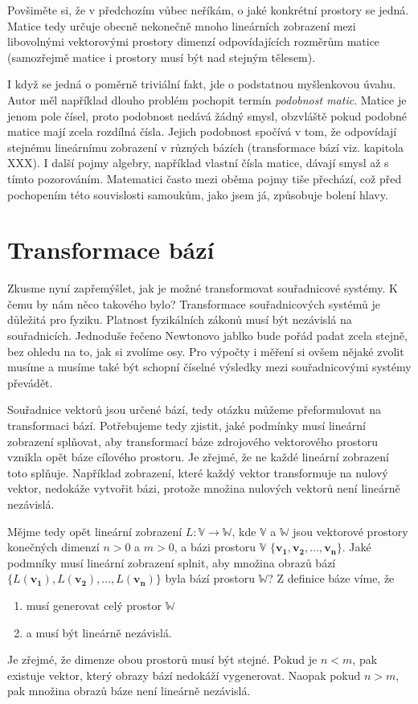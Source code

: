 \documentclass[a5paper,12pt]{amsbook}
\theoremstyle{definition}
\newcommand{\myvec}[1]{\bm{#1}}
\newcommand{\myspace}[1]{\mathbb{#1}}
\newcommand{\mymap}[1]{#1}
\begin{document}
Povšiměte si, že v předchozím vůbec neříkám, o jaké konkrétní prostory se jedná. Matice tedy
určuje obecně nekonečně mnoho lineárních zobrazení mezi libovolnými vektorovými prostory dimenzí
odpovídajících rozměrům matice (samozřejmě matice i prostory musí být nad stejným tělesem).

I když se jedná o poměrně triviální fakt, jde o podstatnou myšlenkovou úvahu.
Autor měl například dlouho problém pochopit termín \textit{podobnost matic}. Matice je jenom
pole čísel, proto podobnost nedává žádný smysl, obzvláště pokud podobné matice mají zcela
rozdílná čísla. Jejich podobnost spočívá v tom, že odpovídají stejnému lineárnímu zobrazení
v různých bázích (transformace bází viz. kapitola XXX). I další pojmy algebry, například vlastní
čísla matice, dávají smysl až s tímto pozorováním. Matematici často mezi oběma pojmy tiše přechází,
což před pochopením této souvislosti samoukům, jako jsem já, způsobuje bolení hlavy.

\section{Transformace bází}

\noindent Zkusme nyní zapřemýšlet, jak je možné transformovat souřadnicové systémy.  K čemu by nám
něco takového bylo? Transformace souřadnicových systémů je důležitá pro fyziku. Platnost
fyzikálních zákonů musí být nezávislá na souřadnicích. Jednoduše řečeno Newtonovo jablko bude
pořád padat zcela stejně, bez ohledu na to, jak si zvolíme osy. Pro výpočty i měření si ovšem
nějaké zvolit musíme a musíme také být schopní číselné výsledky mezi souřadnicovými systémy
převádět.

Souřadnice vektorů jsou určené bází, tedy otázku můžeme přeformulovat na transformaci bází.
Potřebujeme tedy zjistit, jaké podmínky musí lineární zobrazení splňovat, aby transformací
báze zdrojového vektorového prostoru vznikla opět báze cílového prostoru. Je zřejmé, že ne každé
lineární zobrazení toto splňuje. Například zobrazení, které každý vektor transformuje na nulový
vektor, nedokáže vytvořit bázi, protože množina nulových vektorů není lineárně nezávislá.

Mějme tedy opět lineární zobrazení $\mymap{L}: \myspace{V}\rightarrow\myspace{W}$, kde $\myspace{V}$
a $\myspace{W}$ jsou vektorové prostory konečných dimenzí $n > 0$ a $m > 0$, a bázi prostoru $\myspace{V}$
$\{\myvec{v_1}, \myvec{v_2}, \ldots, \myvec{v_n}\}$. Jaké podmníky musí lineární zobrazení
splnit, aby množina obrazů bází $\{\mymap{L}(\myvec{v_1}), \mymap{L}(\myvec{v_2}), \ldots, 
\mymap{L}(\myvec{v_n})\}$ byla bází prostoru $\myspace{W}$? Z definice báze víme, že
\begin{enumerate}
  \item musí generovat celý prostor $\myspace{W}$
  \item a musí být lineárně nezávislá.
\end{enumerate}
Je zřejmé, že dimenze obou prostorů musí být stejné. Pokud je $n < m$, pak existuje vektor, který
obrazy bází nedokáží vygenerovat. Naopak pokud $n > m$, pak množina obrazů báze není lineárně
nezávislá.
\end{document}
